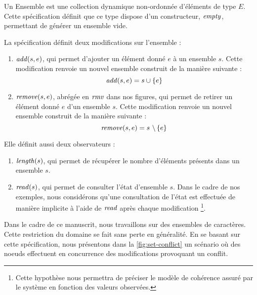 Un Ensemble est une collection dynamique non-ordonnée d'éléments de type $E$.
Cette spécification définit que ce type dispose d'un constructeur, $\mathit{empty}$, permettant de générer un ensemble vide.

La spécification définit deux modifications sur l'ensemble :
\begin{enumerate}
  \item $\mathit{add}(s,e)$, qui permet d'ajouter un élément donné $e$ à un ensemble $s$.
    Cette modification renvoie un nouvel ensemble construit de la manière suivante :
    \begin{equation*}
      \mathit{add}(s,e) = s \cup \left\{e\right\}
    \end{equation*}
  \item $\mathit{remove}(s,e)$, abrégée en $\mathit{rmv}$ dans nos figures, qui permet de retirer un élément donné $e$ d'un ensemble $s$.
    Cette modification renvoie un nouvel ensemble construit de la manière suivante :
    \begin{equation*}
      \mathit{remove}(s,e) = s~\backslash \left\{e\right\}
    \end{equation*}
\end{enumerate}

Elle définit aussi deux observateurs :
\begin{enumerate}
  \item $\mathit{length}(s)$, qui permet de récupérer le nombre d'éléments présents dans un ensemble $s$.
  \item $\mathit{read}(s)$, qui permet de consulter l'état d'ensemble $s$.
    Dans le cadre de nos exemples, nous considérons qu'une consultation de l'état est effectuée de manière implicite à l'aide de $\mathit{read}$ après chaque modification
    \footnote{Cette hypothèse nous permettra de préciser le modèle de cohérence assuré par le système \cite{10.1145/2578855.2535848} en fonction des valeurs observées.}.
\end{enumerate}

Dans le cadre de ce manuscrit, nous travaillons sur des ensembles de caractères.
Cette restriction du domaine se fait sans perte en généralité.
En se basant sur cette spécification, nous présentons dans la \autoref{fig:set-conflict} un scénario où des noeuds effectuent en concurrence des modifications provoquant un conflit.

